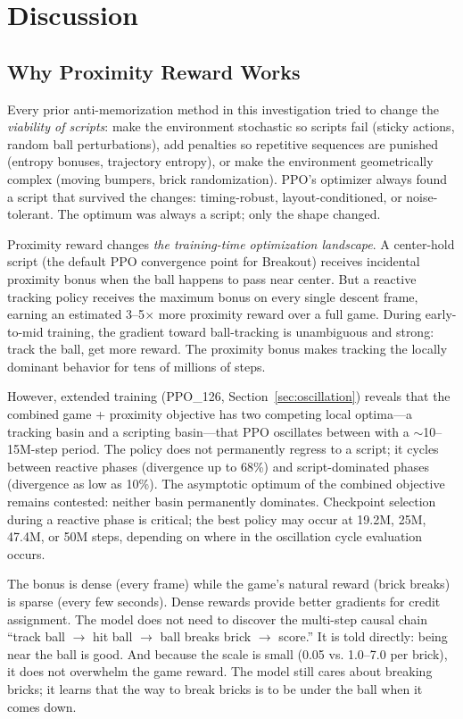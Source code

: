 \documentclass[11pt]{article}
\begin{document}
\section{Discussion}

\subsection{Why Proximity Reward Works}

Every prior anti-memorization method in this investigation tried to change the
\emph{viability of scripts}: make the environment stochastic so scripts fail
(sticky actions, random ball perturbations), add penalties so repetitive
sequences are punished (entropy bonuses, trajectory entropy), or make the
environment geometrically complex (moving bumpers, brick randomization). PPO's
optimizer always found a script that survived the changes: timing-robust,
layout-conditioned, or noise-tolerant. The optimum was always a script; only
the shape changed.

Proximity reward changes \emph{the training-time optimization landscape}. A
center-hold script (the default PPO convergence point for Breakout) receives
incidental proximity bonus when the ball happens to pass near center. But a
reactive tracking policy receives the maximum bonus on every single descent
frame, earning an estimated 3--5$\times$ more proximity reward over a full
game. During early-to-mid training, the gradient toward ball-tracking is
unambiguous and strong: track the ball, get more reward. The proximity bonus
makes tracking the locally dominant behavior for tens of millions of steps.

However, extended training (PPO\_126, Section~\ref{sec:oscillation})
reveals that the combined game + proximity objective has two competing local
optima---a tracking basin and a scripting basin---that PPO oscillates
between with a $\sim$10--15M-step period. The policy does not permanently
regress to a script; it cycles between reactive phases (divergence up to
68\%) and script-dominated phases (divergence as low as 10\%). The
asymptotic optimum of the combined objective remains contested: neither
basin permanently dominates. Checkpoint selection during a reactive phase is
critical; the best policy may occur at 19.2M, 25M, 47.4M, or 50M steps,
depending on where in the oscillation cycle evaluation occurs.

The bonus is dense (every frame) while the game's natural reward (brick
breaks) is sparse (every few seconds). Dense rewards provide better gradients
for credit assignment. The model does not need to discover the multi-step
causal chain ``track ball $\rightarrow$ hit ball $\rightarrow$ ball breaks
brick $\rightarrow$ score.'' It is told directly: being near the ball is good.
And because the scale is small (0.05 vs. 1.0--7.0 per brick), it does not
overwhelm the game reward. The model still cares about breaking bricks; it
learns that the way to break bricks is to be under the ball when it comes down.
\end{document}
